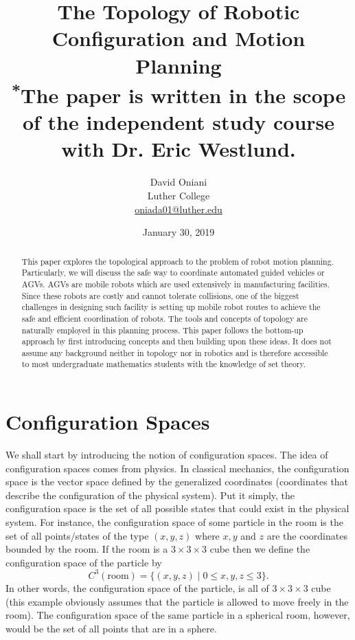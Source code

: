 \documentclass[12pt]{article}
\title{\textbf{The Topology of Robotic Configuration and Motion Planning}\\
{\small \textsuperscript{*}The paper is written in the scope of the independent study course with Dr. Eric Westlund.}}
\author{David Oniani\\Luther College\\\href{mailto:oniada01@luther.edu}{oniada01@luther.edu}}
\date{January 30, 2019}
\theoremstyle{definition}
\begin{document}
\maketitle


\begin{abstract}

\noindent This paper explores the topological approach to the problem
of robot motion planning. Particularly, we will discuss the safe way
to coordinate automated guided vehicles or AGVs. AGVs are mobile robots
which are used extensively in manufacturing facilities. Since these robots
are costly and cannot tolerate collisions, one of the biggest challenges
in designing such facility is setting up mobile robot routes to achieve
the safe and efficient coordination of robots. The tools and concepts of
topology are naturally employed in this planning process. This paper
follows the bottom-up approach by first introducing concepts and then
building upon these ideas. It does not assume any background neither in
topology nor in robotics and is therefore accessible to most undergraduate
mathematics students with the knowledge of set theory.
\end{abstract}


\newpage
\tableofcontents
\newpage


\section*{\centering Configuration Spaces}

We shall start by introducing the notion of configuration spaces.
The idea of configuration spaces comes from physics. In classical
mechanics, the configuration space is the vector space defined by
the generalized coordinates (coordinates that describe the configuration
of the physical system). Put it simply, the configuration space is
the set of all possible states that could exist in the physical system.
For instance, the configuration space of some particle in the room is
the set of all points/states of the type $(x, y, z)$ where $x, y$ and $z$
are the coordinates bounded by the room. If the room is a $3 \times 3 \times 3$
cube then we define the configuration space of the particle by
$$C^3(\text{room}) = \{(x, y, z) \mid 0 \leq x, y, z \leq 3\}.$$
In other words, the configuration space of the particle, is all of
$3 \times 3 \times 3$ cube (this example obviously assumes that the
particle is allowed to move freely in the room). The configuration space
of the same particle in a spherical room, however, would be the set of all
points that are in a sphere.
\end{document}

